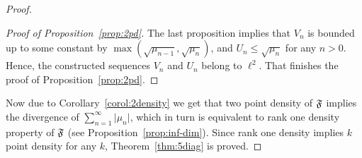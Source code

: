 \begin{proof}
\begin{proof}[Proof of Proposition~\ref{prop:2pd}]
        The last proposition implies that $V_n$ is bounded up to some constant by $\max(\sqrt{\mu_{n-1}}, \sqrt{\mu_n})$, and
          $U_n \leq \sqrt{\mu_n}$ for any $n > 0$.
        Hence, the constructed sequences $V_n$ and $U_n$ belong to $\ell^2$.
        That finishes the proof of Proposition~\ref{prop:2pd}.
      \end{proof}
      Now due to Corollary~\ref{corol:2density} we get that two point density of $\mathfrak{F}$ implies the divergence of $\sum_{n=1}^\infty \lvert \mu_n\rvert$,
        which in turn is equivalent to rank one density property of $\mathfrak{F}$ (see Proposition~\ref{prop:inf-dim}).
      Since rank one density implies $k$ point density for any $k$, Theorem~\ref{thm:5diag} is proved.
    \end{proof}
